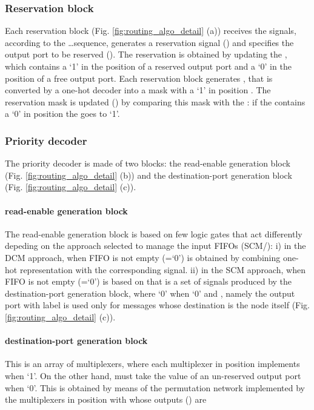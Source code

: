 \documentclass[10pt,twocolumn,journal]{IEEEtran}
\begin{document}
\subsubsection{Reservation block}
Each reservation block (Fig. \ref{fig:routing_algo_detail} (a)) receives the  signals, according 
to the  \dots  sequence, generates a reservation 
signal () and specifies the output port to be reserved ().
The reservation is obtained by updating the , which contains a `1' in the position of 
a reserved output port and a `0' in the position of a free output port. Each reservation block generates 
, that is converted by a one-hot decoder into a mask with a 
`1' in position . The reservation mask is updated ()
by comparing this mask with the
: if the  contains a `0' in position  
the  goes to `1'.

\subsubsection{Priority decoder}
The priority decoder is made of two blocks: the read-enable generation block (Fig. \ref{fig:routing_algo_detail} (b)) 
and the destination-port generation block (Fig. \ref{fig:routing_algo_detail} (c)). 

\paragraph{read-enable generation block}
The read-enable generation block is based on few logic gates that act differently depeding on the approach selected 
to manage the input FIFOs (SCM/): i) in the DCM approach, 
 when FIFO  is not empty (=`0') 
is obtained by combining  one-hot representation with the corresponding  signal.
ii) in the SCM approach, 
 when FIFO  is not empty (=`0') 
is based on  that is a set of  signals produced by the destination-port generation block, 
where `0' when `0' and , namely 
the output port with label  is used only for messages whose destination is the node itself 
(Fig. \ref{fig:routing_algo_detail} (c)).

\paragraph{destination-port generation block}
This is an array of multiplexers, where each multiplexer in position  implements 
 when `1'. On the other hand,  must 
take the value of an un-reserved output port when `0'. 
This is obtained by means of the permutation network implemented by 
the multiplexers in position  with  whose outputs () are
\end{document}
